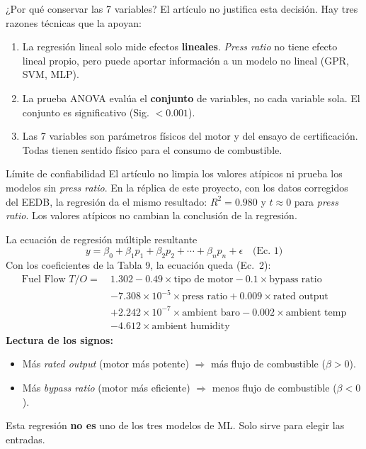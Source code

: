 \documentclass{beamer}
\begin{document}
\begin{frame}{¿Por qué conservar las 7 variables?}
    \justifying\small
    El artículo no justifica esta decisión. Hay tres razones técnicas que la apoyan:
    \begin{enumerate}
        \item La regresión lineal solo mide efectos \textbf{lineales}. \textit{Press ratio} no tiene efecto lineal propio, pero puede aportar información a un modelo no lineal (GPR, SVM, MLP).
        \item La prueba ANOVA evalúa el \textbf{conjunto} de variables, no cada variable sola. El conjunto es significativo (Sig. $< 0.001$).
        \item Las 7 variables son parámetros físicos del motor y del ensayo de certificación. Todas tienen sentido físico para el consumo de combustible.
    \end{enumerate}
    \begin{alertblock}{Límite de confiabilidad}
        El artículo no limpia los valores atípicos ni prueba los modelos sin \textit{press ratio}. En la réplica de este proyecto, con los datos corregidos del EEDB, la regresión da el mismo resultado: $R^2 = 0.980$ y $t \approx 0$ para \textit{press ratio}. Los valores atípicos no cambian la conclusión de la regresión.
    \end{alertblock}
\end{frame}

\begin{frame}{La ecuación de regresión múltiple resultante}
    \small
    $$ y = \beta_0 + \beta_1 p_1 + \beta_2 p_2 + \cdots + \beta_n p_n + \epsilon \quad \text{(Ec.~1)} $$
    Con los coeficientes de la Tabla 9, la ecuación queda (Ec.~2):
    \begin{align*}
        \text{Fuel Flow } T/O = \ & 1.302 - 0.49 \times \text{tipo de motor} - 0.1 \times \text{bypass ratio} \\
        & - 7.308\times10^{-5} \times \text{press ratio} + 0.009 \times \text{rated output} \\
        & + 2.242\times10^{-7} \times \text{ambient baro} - 0.002 \times \text{ambient temp} \\
        & - 4.612 \times \text{ambient humidity}
    \end{align*}
    \footnotesize\textbf{Lectura de los signos:}
    \begin{itemize}
        \item Más \textit{rated output} (motor más potente) $\Rightarrow$ más flujo de combustible ($\beta>0$).
        \item Más \textit{bypass ratio} (motor más eficiente) $\Rightarrow$ menos flujo de combustible ($\beta<0$).
    \end{itemize}
    Esta regresión \textbf{no es} uno de los tres modelos de ML. Solo sirve para elegir las entradas.
\end{frame}
\end{document}
